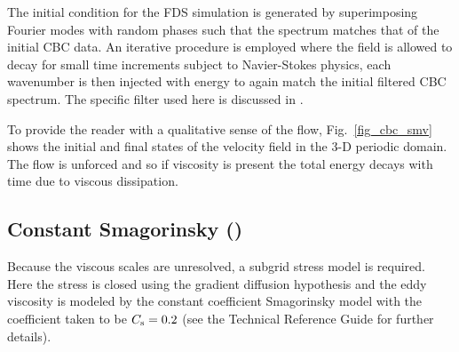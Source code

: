 \documentclass[11pt]{book}
\begin{document}
The initial condition for the FDS simulation is generated by superimposing Fourier modes with random phases such that the spectrum matches that of the initial CBC data.  An iterative procedure is employed where the field is allowed to decay for small time increments subject to Navier-Stokes physics, each wavenumber is then injected with energy to again match the initial filtered CBC spectrum.  The specific filter used here is discussed in \cite{McDermott:2005b}.

To provide the reader with a qualitative sense of the flow, Fig.~\ref{fig_cbc_smv} shows the initial and final states of the velocity field in the 3-D periodic domain.  The flow is unforced and so if viscosity is present the total energy decays with time due to viscous dissipation.

\subsection{Constant Smagorinsky (\texorpdfstring{}{csmag})}

Because the viscous scales are unresolved, a subgrid stress model is required. Here the stress is closed using the gradient diffusion hypothesis and the eddy viscosity is modeled by the constant coefficient Smagorinsky model with the coefficient taken to be $C_{\rm s} = 0.2$ (see the Technical Reference Guide for further details).
\end{document}
